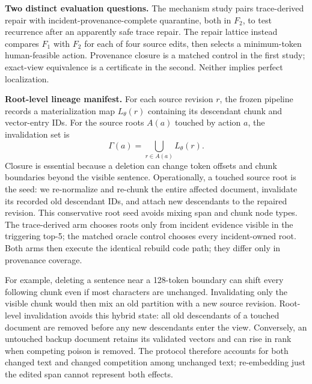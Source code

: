 \documentclass{article}
\newcommand{\fone}{\ensuremath{F_1}}
\newcommand{\ftwo}{\ensuremath{F_2}}
\begin{document}
\textbf{Two distinct evaluation questions.} The mechanism study pairs
trace-derived repair with incident-provenance-complete quarantine, both in
\ftwo{}, to test recurrence after an apparently safe trace repair. The repair
lattice instead compares \fone{} with \ftwo{} for each of four source edits,
then selects a minimum-token human-feasible action. Provenance closure is a
matched control in the first study; exact-view equivalence is a certificate in
the second. Neither implies perfect localization.

\textbf{Root-level lineage manifest.} For each source revision $r$, the frozen
pipeline records a materialization map $L_\theta(r)$ containing its descendant
chunk and vector-entry IDs. For the source roots $A(a)$ touched by action $a$,
the invalidation set is
\begin{equation}
 \Gamma(a)=\bigcup_{r\in A(a)}L_\theta(r).
\end{equation}
Closure is essential because a deletion can change token offsets and chunk
boundaries beyond the visible sentence. Operationally, a touched source root is
the seed: we re-normalize and re-chunk the entire affected document, invalidate
its recorded old descendant IDs, and attach new descendants to the repaired
revision. This conservative root seed avoids mixing span and chunk node types.
The trace-derived arm chooses roots only from incident evidence visible in the
triggering top-5; the matched oracle control chooses every incident-owned root.
Both arms
then execute the identical rebuild code path; they differ only in provenance
coverage.

For example, deleting a sentence near a 128-token boundary can shift every
following chunk even if most characters are unchanged. Invalidating only the
visible chunk would then mix an old partition with a new source revision.
Root-level invalidation avoids this hybrid state: all old descendants of a
touched document are removed before any new descendants enter the view.
Conversely, an untouched backup document retains its validated vectors and
can rise in rank when competing poison is removed. The protocol therefore
accounts for both changed text and changed competition among unchanged text;
re-embedding just the edited span cannot represent both effects.
\end{document}
